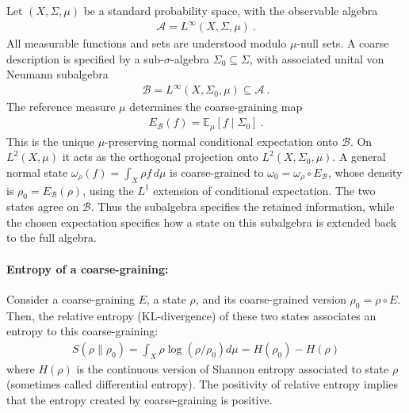 \documentclass[a4paper,11pt]{article}
\theoremstyle{definition}
\newcommand{\mA}{\mathcal{A}}
\newcommand{\mB}{\mathcal{B}}
\begin{document}
Let $(X,\Sigma,\mu)$ be a standard probability space, with the observable algebra
\begin{align}
    \mA=L^\infty(X,\Sigma,\mu)\ .
\end{align}
All measurable functions and sets are understood modulo $\mu$-null sets. A coarse description is specified by a sub-$\sigma$-algebra $\Sigma_0\subseteq\Sigma$, with associated unital von Neumann subalgebra
\begin{align}
    \mB=L^\infty(X,\Sigma_0,\mu)\subseteq\mA\ .
\end{align}
The reference measure $\mu$ determines the coarse-graining map
\begin{align}
    E_{\mB}(f)=\mathbb E_\mu[f\mid\Sigma_0]\ .
\end{align}
This is the unique $\mu$-preserving normal conditional expectation onto $\mB$. On $L^2(X,\mu)$ it acts as the orthogonal projection onto $L^2(X,\Sigma_0,\mu)$. A general normal state $\omega_\rho(f)=\int_X\rho f\,d\mu$ is coarse-grained to $\omega_0=\omega_\rho\circ E_{\mB}$, whose density is $\rho_0=E_{\mB}(\rho)$, using the $L^1$ extension of conditional expectation. The two states agree on $\mB$. Thus the subalgebra specifies the retained information, while the chosen expectation specifies how a state on this subalgebra is extended back to the full algebra.


\paragraph{Entropy of a coarse-graining:} Consider a coarse-graining $E$, a state $\rho$, and its coarse-grained version $\rho_0=\rho\circ E$. Then, the relative entropy (KL-divergence) of these two states associates an entropy to this coarse-graining:
\begin{align}
    S(\rho\|\rho_0)=\int_X \rho \log(\rho/\rho_0)d\mu=H(\rho_0)-H(\rho)
\end{align}
where $H(\rho)$ is the continuous version of Shannon entropy associated to state $\rho$ (sometimes called differential entropy). The positivity of relative entropy implies that the entropy created by coarse-graining is positive.
\end{document}
